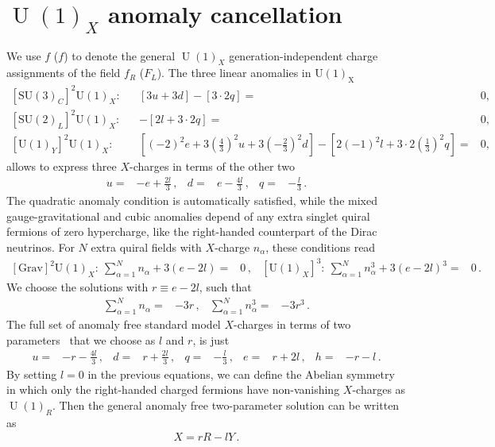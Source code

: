 \documentclass[12pt]{article}
\begin{document}
\section{$\operatorname{U}(1)_X$ anomaly cancellation }
We use $f$ ($f$) to denote the general $\operatorname{U}(1)_X$ generation-independent charge assignments of the field $f_R$ ($F_L$). The three linear anomalies in $\operatorname{U(1)_X}$~\cite{Campos:2017dgc}
\begin{align}
  \label{eq:anolin}
  \left[\mathrm{SU}(3)_{C}\right]^{2} \mathrm{U}(1)_{X} :& &
[3 u+3 d]-[3 \cdot 2 q]=&0, \nonumber\\
\left[\mathrm{SU}(2)_{L}\right]^{2} \mathrm{U}(1)_{X} :&&
-[2 l+3 \cdot 2 q]=&0, \nonumber\\
\left[\mathrm{U}(1)_{Y}\right]^{2} \mathrm{U}(1)_{X} :&&
{ \left[(-2)^{2} e+3\left(\tfrac{4}{3}\right)^{2} u+3\left(-\tfrac{2}{3}\right)^{2} d\right]-\left[2(-1)^{2} l+3 \cdot 2\left(\tfrac{1}{3}\right)^{2} q\right]}=&
 0,
  \end{align}
allows to express three $X$-charges in terms of the other two
\begin{align}
  u=&-e+\frac{2l}{3}\,,& d=& e-\frac{4l}{3}\,,& q=& -\frac{l}{3}\,.
\end{align}
The quadratic anomaly condition is automatically satisfied, while the mixed gauge-gravitational and cubic anomalies depend of any extra singlet quiral fermions of zero hypercharge, like the right-handed counterpart of the Dirac neutrinos. For $N$ extra quiral fields with $X$-charge $n_{\alpha}$, these conditions read
\begin{align}
  \left[\text{Grav}\right]^{2} \mathrm{U}(1)_{X}:\ \sum_{\alpha=1}^N n_{\alpha}+3 (e-2l)=&0\,, &  \left[\mathrm{U}(1)_{X}\right]^{3}:\ \sum_{\alpha=1}^N n_{\alpha}^3+3 (e-2l)^3=&0\,. &
\end{align}
We choose the solutions with $r\equiv e-2l$, such that
\begin{align}
  \label{eq:anolam}
  \sum_{\alpha=1}^{N} n_{\alpha}=&-3 r\,,   & \sum_{\alpha=1}^{N} n_{\alpha}^3=&-3 r^3\,.
\end{align}
The full set of anomaly free standard model $X$-charges in terms of two parameters~\cite{Appelquist:2002mw,Campos:2017dgc} that we choose as $l$ and $r$, is just
\begin{align}
  u=&-r-\frac{4l}{3}\,,&d=&r+\frac{2l}{3}\,,&q=&-\frac{l}{3}\,,&e=&r+2l\,,&h=&-r-l\,.
  \label{Eq:SMCharges}
\end{align}
By setting $l=0$ in the previous equations, we can define the Abelian symmetry in which only the right-handed charged fermions have non-vanishing $X$-charges as $\operatorname{U}(1)_R$. Then the general anomaly free two-parameter solution can be written as
\begin{align}
  X=r R- l Y\,.
\end{align}
\end{document}
